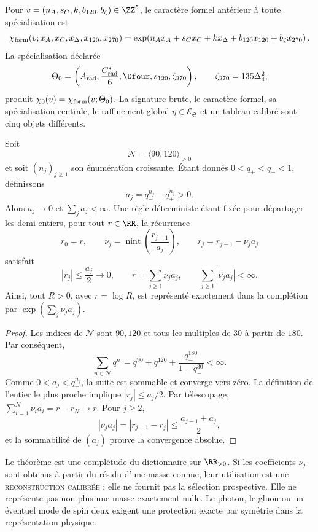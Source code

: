 Pour \(v=(n_A,s_C,k,b_{120},b_{\zeta})\in\ZZ^5\), le caractère formel
antérieur à toute spécialisation est
\[
 \chi_{\rm form}(v;x_A,x_C,x_\Delta,x_{120},x_{270})
 =\exp\!\left(
 n_Ax_A+s_Cx_C+kx_\Delta
 +b_{120}x_{120}+b_{\zeta}x_{270}\right).
\]
La spécialisation déclarée
\[
 \Theta_0
 =\left(A_{\rm rad},\frac{C^\ast_{\rm rad}}6,
 \Dfour,s_{120},\zeta_{270}\right),
 \qquad \zeta_{270}=135\Delta_4^2,
\]
produit
\(\chi_0(v)
=\chi_{\rm form}(v;\Theta_0)\).
La signature brute, le caractère formel, sa spécialisation centrale, le
raffinement global \(\eta\in\mathcal E_{\mathfrak S}\) et un tableau
calibré sont cinq objets différents.

\begin{theorem}
\label{thm:completitud-reconstructiva-positiva}
Soit
\[
 \mathcal N=\langle90,120\rangle_{>0}
\]
et soit \((n_j)_{j\ge1}\) son énumération croissante. Étant donnés
\(0<q_+<q_-<1\), définissons
\[
 a_j=q_-^{n_j}-q_+^{n_j}>0.
\]
Alors \(a_j\to0\) et \(\sum_ja_j<\infty\). Une règle déterministe étant fixée
pour départager les demi-entiers, pour tout \(r\in\RR\), la récurrence
\[
 r_0=r,\qquad
 \nu_j=\operatorname{nint}\!\left(\frac{r_{j-1}}{a_j}\right),\qquad
 r_j=r_{j-1}-\nu_ja_j
\]
satisfait
\[
 |r_j|\leq\frac{a_j}{2}\longrightarrow0,\qquad
 r=\sum_{j\ge1}\nu_ja_j,\qquad
 \sum_{j\ge1}|\nu_ja_j|<\infty.
\]
Ainsi, tout \(R>0\), avec \(r=\log R\), est représenté exactement dans la
complétion par
\(\exp(\sum_j\nu_ja_j)\).
\end{theorem}

\begin{proof}
Les indices de \(\mathcal N\) sont \(90,120\) et tous les multiples de \(30\)
à partir de \(180\). Par conséquent,
\[
 \sum_{n\in\mathcal N}q_-^n
 =q_-^{90}+q_-^{120}
 +\frac{q_-^{180}}{1-q_-^{30}}<\infty.
\]
Comme \(0<a_j<q_-^{n_j}\), la suite est sommable et converge vers zéro. La
définition de l'entier le plus proche implique
\(|r_j|\le a_j/2\). Par télescopage,
\(\sum_{i=1}^{N}\nu_ia_i=r-r_N\to r\). Pour \(j\ge2\),
\[
 |\nu_ja_j|=|r_{j-1}-r_j|
 \le\frac{a_{j-1}+a_j}{2},
\]
et la sommabilité de \((a_j)\) prouve la convergence absolue.
\end{proof}

Le théorème est une complétude du dictionnaire sur \(\RR_{>0}\). Si les
coefficients \(\nu_j\) sont obtenus à partir du résidu d'une masse connue, leur utilisation
est une \textsc{reconstruction calibrée} ; elle ne fournit pas la sélection
prospective. Elle ne représente pas non plus une masse exactement nulle. Le photon, le gluon ou un
éventuel mode de spin deux exigent une protection exacte par symétrie dans la
représentation physique.

